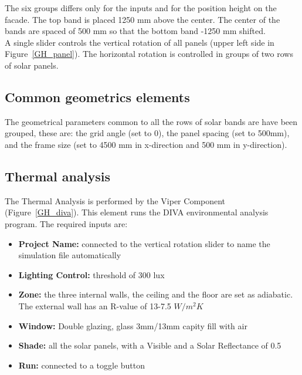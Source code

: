 The six groups differs only for the inputs and for the position height on the facade. The top band is placed 1250 mm above the center. The center of the bands are spaced of 500 mm so that the bottom band  -1250 mm shifted.\\
A single slider controls the vertical rotation of all panels (upper left side in Figure~\ref{GH_panel}).
The horizontal rotation is controlled in groups of two rows of solar panels.

\subsection{Common geometrics elements}

The geometrical parameters common to all the rows of solar bands are have been grouped, these are: the grid angle (set to 0), the panel spacing (set to 500mm), and the frame size (set to 4500 mm in x-direction and 500 mm in y-direction).

\subsection{Thermal analysis}

The Thermal Analysis is performed by the Viper Component (Figure~\ref{GH_diva}). This element runs the DIVA environmental analysis program. The required inputs are:
\begin{itemize}
\item \textbf{Project Name:} connected to the vertical rotation slider to name the simulation file automatically
\item \textbf{Lighting Control:} threshold of 300 lux
\item \textbf{Zone:} the three internal walls, the ceiling and the floor are set as adiabatic. The external wall has an R-value of 13-7.5 $W / m^{2} K $
\item \textbf{Window:} Double glazing, glass 3mm/13mm capity fill with air
\item \textbf{Shade:} all the solar panels, with a Visible and a Solar Reflectance of 0.5
\item \textbf{Run:} connected to a toggle button
\end{itemize}


